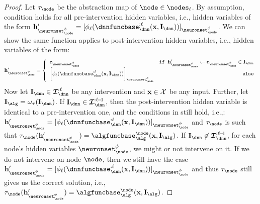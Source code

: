 \begin{proof}
    Let $\abstractionmap_{\node}$ be the abstraction map of $\node \in \nodes_{\layer}$.
    By assumption, condition  holds for all pre-intervention hidden variables, i.e., hidden variables of the form $\hiddenstates'_{\neuronset^{\causalmap}_{\node}} = [\causalmap_{\layer}(\dnnfunclayer{:\layer}(\bx, \interventionsdnn))]_{\neuronset^{\causalmap}_{\node}}$.
    We can show the same function applies to post-intervention hidden variables, i.e., hidden variables of the form:
    \begin{align}
        \hiddenstates'_{\neuronset^{\causalmap}_{\node}} = 
        \left\{\begin{array}{lr}
            \constants_{\neuronset^{\causalmap}_{\node}} & \texttt{if } \hiddenstates'_{\neuronset^{\causalmap}_{\node}} \leftarrow \constants_{\neuronset^{\causalmap}_{\node}} \in \interventionsdnn \\
            \bigg[\causalmap_{\layer}
            (\dnnfunclayer{:\layer}
            (\bx, \interventionsdnn))
            \bigg]_{\neuronset^{\causalmap}_{\node}} 
            & \texttt{else}
        \end{array}\right.
    \end{align}
    Now let 
    $\interventionsdnn \in \interventionsset^{:\layer}_{\dnn}$ be any intervention and $\mathbf{x} \in \mathcal{X}$ be any input.
    Further, let $\interventions_{\alg} = \omega_{\abstractionmap}(\interventionsdnn)$.
    If $\interventionsdnn \in \interventionsset^{:\layer\!-\!1}_{\dnn}$, then the post-intervention hidden variable is identical to a pre-intervention one, and the conditions in  still hold, i.e.,: $\hiddenstates'_{\neuronset^{\causalmap}_{\node}} = [\causalmap_{\layer}(\dnnfunclayer{:\layer}(\bx, \interventionsdnn))]_{\neuronset^{\causalmap}_{\node}}$ and $\abstractionmap_{\node}$ is such that
    $\abstractionmap_{\node}(\hiddenstates'_{\neuronset^{\causalmap}_{\node}}) = \algfuncnode{\node}(\bx, \interventions_{\alg})$.
    If $\interventionsdnn \not\in \interventionsset^{:\layer\!-\!1}_{\dnn}$, for each node's hidden variables $\neuronset^{\causalmap}_{\node}$, we might or not intervene on it.
    If we do not intervene on node $\node$, then we still have the case $\hiddenstates'_{\neuronset^{\causalmap}_{\node}} = [\causalmap_{\layer}(\dnnfunclayer{:\layer}(\bx, \interventionsdnn))]_{\neuronset^{\causalmap}_{\node}}$ and thus $\abstractionmap_{\node}$ still gives us the correct solution, i.e.,
    $\abstractionmap_{\node}(\hiddenstates'_{\neuronset^{\causalmap}_{\node}}) = \algfuncnode{\node}(\bx, \interventions_{\alg})$.

\end{proof}
